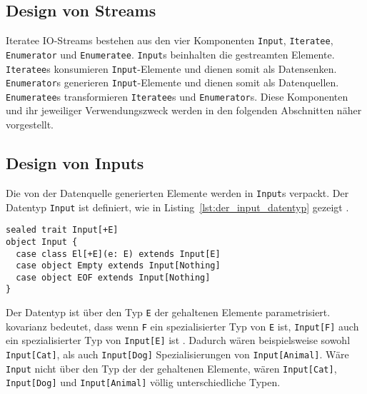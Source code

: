 \subsection{Design von Streams} %
\label{sub:design}

Iteratee IO-Streams bestehen aus den vier Komponenten \lstinline|Input|, \lstinline|Iteratee|, \lstinline|Enumerator| und \lstinline|Enumeratee|.
\lstinline|Input|s beinhalten die gestreamten Elemente.
\lstinline|Iteratee|s konsumieren \lstinline|Input|-Elemente und dienen somit als Datensenken.
\lstinline|Enumerator|s generieren \lstinline|Input|-Elemente und dienen somit als Datenquellen.
\lstinline|Enumeratee|s transformieren \lstinline|Iteratee|s und \lstinline|Enumerator|s.
Diese Komponenten und ihr jeweiliger Verwendungszweck werden in den folgenden Abschnitten näher vorgestellt.



\subsection{Design von Inputs} %
\label{sub:design_inputs}

Die von der Datenquelle generierten Elemente werden in \lstinline|Input|s verpackt.
Der Datentyp \lstinline|Input| ist definiert, wie in Listing~\ref{lst:der_input_datentyp} gezeigt \cite[vgl.][Z.~224]{play_iteratee_source_code}.

\begin{lstlisting}[caption=Der Input-Datentyp, label=lst:der_input_datentyp]
sealed trait Input[+E]
object Input {
  case class El[+E](e: E) extends Input[E]
  case object Empty extends Input[Nothing]
  case object EOF extends Input[Nothing]
}
\end{lstlisting}

Der Datentyp ist über den  Typ \lstinline|E| der gehaltenen Elemente parametrisiert.
\gls{kovarianz} bedeutet, dass wenn \lstinline|F| ein spezialisierter Typ von \lstinline|E| ist, \lstinline|Input[F]| auch ein spezialisierter Typ von \lstinline|Input[E]| ist \cite[vgl.][S.~11]{variance}.
Dadurch wären beispielsweise sowohl \lstinline|Input[Cat]|, als auch \lstinline|Input[Dog]| Spezialisierungen von \lstinline|Input[Animal]|.
Wäre \lstinline|Input| nicht  über den Typ der der gehaltenen Elemente, wären \lstinline|Input[Cat]|, \lstinline|Input[Dog]| und \lstinline|Input[Animal]| völlig unterschiedliche Typen.

